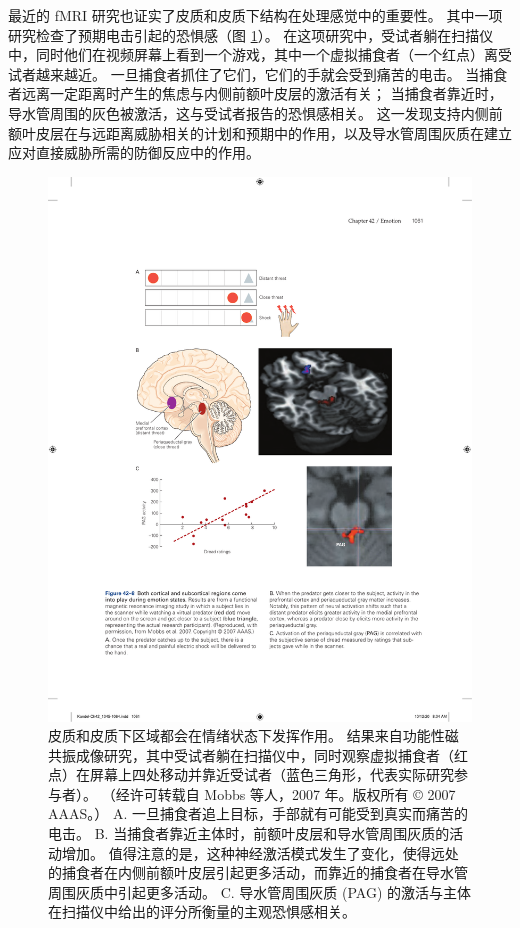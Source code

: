 最近的 fMRI 研究也证实了皮质和皮质下结构在处理感觉中的重要性。 
其中一项研究检查了预期电击引起的恐惧感（图 \ref{fig:42_8}）。 
在这项研究中，受试者躺在扫描仪中，同时他们在视频屏幕上看到一个游戏，其中一个虚拟捕食者（一个红点）离受试者越来越近。 一旦捕食者抓住了它们，它们的手就会受到痛苦的电击。 当捕食者远离一定距离时产生的焦虑与内侧前额叶皮层的激活有关； 当捕食者靠近时，导水管周围的灰色被激活，这与受试者报告的恐惧感相关。 这一发现支持内侧前额叶皮层在与远距离威胁相关的计划和预期中的作用，以及导水管周围灰质在建立应对直接威胁所需的防御反应中的作用。

\begin{figure}[htbp]
	\centering
	\includegraphics[width=0.75\linewidth]{chap42/fig_42_8}
	\caption{皮质和皮质下区域都会在情绪状态下发挥作用。 结果来自功能性磁共振成像研究，其中受试者躺在扫描仪中，同时观察虚拟捕食者（红点）在屏幕上四处移动并靠近受试者（蓝色三角形，代表实际研究参与者）。 （经许可转载自 Mobbs 等人，2007 年。版权所有 © 2007 AAAS。） A. 一旦捕食者追上目标，手部就有可能受到真实而痛苦的电击。 B. 当捕食者靠近主体时，前额叶皮层和导水管周围灰质的活动增加。 值得注意的是，这种神经激活模式发生了变化，使得远处的捕食者在内侧前额叶皮层引起更多活动，而靠近的捕食者在导水管周围灰质中引起更多活动。 C. 导水管周围灰质 (PAG) 的激活与主体在扫描仪中给出的评分所衡量的主观恐惧感相关。}
	\label{fig:42_8}
\end{figure}

